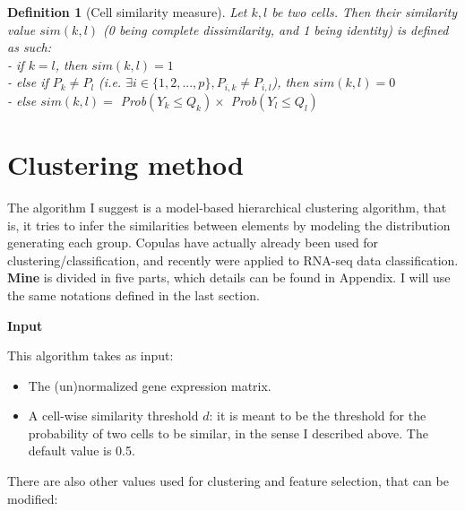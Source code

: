 \documentclass{report}
\newtheorem{definition}{Definition}[section]
\begin{document}
\begin{definition}[Cell similarity measure]{Let $k,l$ be two cells. Then their similarity value $sim(k,l)$ (0 being complete dissimilarity, and 1 being identity) is defined as such:\\
- if $k=l$, then $sim(k,l) = 1$\\
- else if $P_k \neq P_l$ (i.e. $\exists i \in \{1,2, ..., p\}, P_{i,k} \neq P_{i,l}$), then $sim(k,l) = 0$\\
- else $sim(k,l) =$ \textit{Prob}$(Y_k \leq Q_k) \times$ \textit{Prob}$(Y_l \leq Q_l)$}\end{definition}

\newpage

\section{Clustering method}

The algorithm I suggest is a model-based hierarchical clustering algorithm\cite{fraley2002model}, that is, it tries to infer the similarities between elements by modeling the distribution generating each group. Copulas have actually already been used for clustering/classification\cite{stitou2009copulas}\cite{kosmidis2014model}, and recently were applied to RNA-seq data classification\cite{zhang2017classification}.\\

\textbf{Mine} is divided in five parts, which details can be found in Appendix. I will use the same notations defined in the last section.

\bigskip
\noindent \textbf{Input}
\bigskip

This algorithm takes as input:\\

\begin{itemize}
\item The (un)normalized gene expression matrix.
\item A cell-wise similarity threshold $d$: it is meant to be the threshold for the probability of two cells to be similar, in the sense I described above. The default value is 0.5.
\end{itemize}

There are also other values used for clustering and feature selection, that can be modified:
\end{document}
